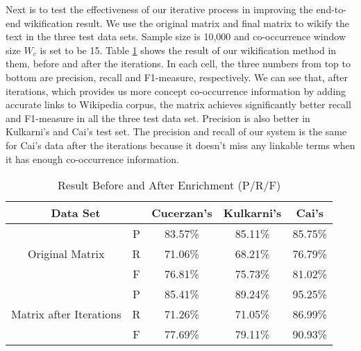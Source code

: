 Next is to test the effectiveness of our iterative process in
improving the end-to-end wikification result.
We use the original matrix and
final matrix to wikify the text in the three test data sets.
Sample size is 10,000 and co-occurrence window size $W_c$ is set to be 15.
Table \ref{tab:result_ba} shows the result of our wikification
method in them, before and after the iterations. In each cell, the three numbers
from top to bottom are precision, recall and F1-measure, respectively.
We can see that, after iterations, which provides us more concept co-occurrence
information by adding accurate links to Wikipedia corpus, the matrix achieves
significantly better recall and F1-measure in all the three test data set.
Precision is also better in Kulkarni's and Cai's test set.
The precision and recall of our system is
the same for Cai's data after the iterations because it doesn't miss
any linkable terms when it has enough co-occurrence information.

\begin{table}[th]
\centering
\begin{tabular}{|c|c|c|c|c|}
\hline
\multicolumn{2}{|c|}{Data Set} & Cucerzan's & Kulkarni's & Cai's \\
\hline \hline
&P& 83.57\% & 85.11\% & 85.75\% \\
Original Matrix &R& 71.06\% & 68.21\% & 76.79\% \\
&F& 76.81\% & 75.73\% & 81.02\% \\
\hline
&P& 85.41\% & 89.24\% & 95.25\% \\
Matrix after Iterations &R& 71.26\% & 71.05\% & 86.99\% \\
&F& 77.69\% & 79.11\% & 90.93\% \\
\hline
\end{tabular}
\caption{Result Before and After Enrichment (P/R/F)}
\label{tab:result_ba}
\end{table}

